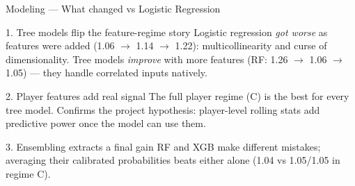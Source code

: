 \begin{frame}{Modeling — What changed vs Logistic Regression}
  \begin{block}{1. Tree models flip the feature-regime story}
    \footnotesize Logistic regression \emph{got worse} as features were added
    (1.06 $\to$ 1.14 $\to$ 1.22): multicollinearity and curse of
    dimensionality.  Tree models \emph{improve} with more features
    (RF: 1.26 $\to$ 1.06 $\to$ 1.05) — they handle correlated inputs natively.
  \end{block}

  \begin{block}{2. Player features add real signal}
    \footnotesize The full player regime (C) is the best for every tree model.
    Confirms the project hypothesis: player-level rolling stats add
    predictive power once the model can use them.
  \end{block}

  \begin{block}{3. Ensembling extracts a final gain}
    \footnotesize RF and XGB make different mistakes; averaging their
    calibrated probabilities beats either alone (1.04 vs 1.05/1.05 in regime C).
  \end{block}
\end{frame}


